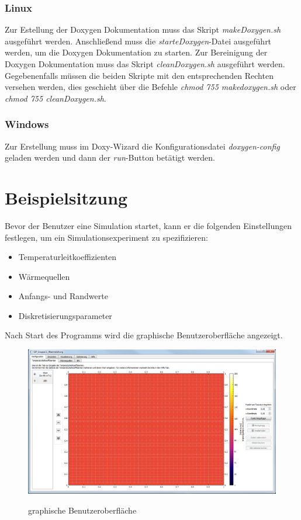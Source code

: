 \subsubsection{Linux}
Zur Estellung der Doxygen Dokumentation muss das Skript \emph{makeDoxygen.sh} ausgeführt werden. Anschließend muss die \emph{starteDoxygen}-Datei ausgeführt werden, um die Doxygen Dokumentation zu starten. Zur Bereinigung der Doxygen Dokumentation muss das Skript \emph{cleanDoxygen.sh} ausgeführt werden. Gegebenenfalls müssen die beiden Skripte mit den entsprechenden Rechten versehen werden, dies geschieht über die Befehle \emph{chmod 755 makedoxygen.sh} oder \emph{chmod 755 cleanDoxygen.sh}. 

\subsubsection{Windows}
Zur Erstellung muss im Doxy-Wizard die Konfigurationsdatei \emph{doxygen-config} geladen werden und dann der \emph{run}-Button betätigt werden.

\newpage
\section{Beispielsitzung}

Bevor der Benutzer eine Simulation startet, kann er die folgenden Einstellungen festlegen, um ein Simulationsexperiment zu spezifizieren:
\begin{itemize}
\item Temperaturleitkoeffizienten
\item Wärmequellen
\item Anfangs- und Randwerte
\item Diskretisierungsparameter
\end{itemize}
\noindent
Nach Start des Programms wird die graphische Benutzeroberfläche angezeigt.
\begin{figure}[H]
\centering
\includegraphics[scale=.5]{Bilder/StartAnzeige.png}\\
\caption{graphische Benutzeroberfläche}
\label{graphische Benutzeroberfläche}
\end{figure}

